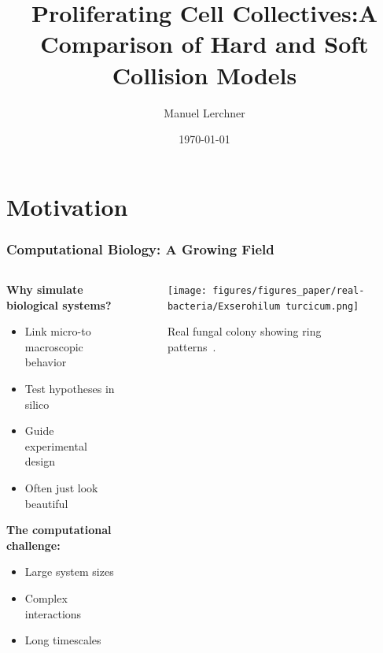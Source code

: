 \documentclass[10pt,t]{beamer}
\title{Proliferating Cell Collectives:\newline A Comparison of Hard and Soft Collision Models}
\author{Manuel Lerchner}
\date{\today}
\begin{document}
\maketitle

\setcounter{framenumber}{0}


\section{Motivation}

\begin{frame}
    \frametitle{Computational Biology: A Growing Field}

    \begin{columns}
        \begin{column}{0.58\textwidth}
            \textbf{Why simulate biological systems?}
            \begin{itemize}
                \item Link micro-to macroscopic behavior
                \item Test hypotheses in silico
                \item Guide experimental design
                \item Often just look beautiful
            \end{itemize}

            \vspace{0.3cm}

            \textbf{The computational challenge:}
            \begin{itemize}
                \item Large system sizes
                \item Complex interactions
                \item Long timescales
            \end{itemize}
        \end{column}

        \begin{column}{0.5\textwidth}
            \centering
            \begin{figure}
                \centering
                \texttt{[image: figures/figures\_paper/real-bacteria/Exserohilum turcicum.png]}
                \caption*{\scriptsize{Real fungal colony showing ring patterns~\cite{Bankole2023}.}}
            \end{figure}
        \end{column}
    \end{columns}

\end{frame}
\end{document}
